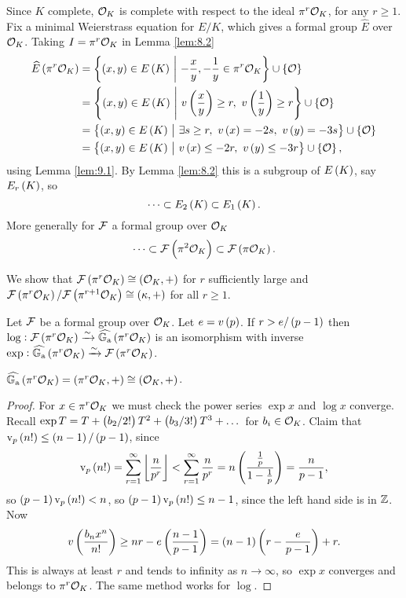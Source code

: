 Since $ K $ complete, $ \mathcal{O}_K $ is complete with respect to the ideal $ \pi^r\mathcal{O}_K $, for any $ r \ge 1 $. Fix a minimal Weierstrass equation for $ E / K $, which gives a formal group $ \widehat{E} $ over $ \mathcal{O}_K $. Taking $ I = \pi^r\mathcal{O}_K $ in Lemma \ref{lem:8.2}
\begin{align*}
\widehat{E}\br{\pi^r\OOO_K}
& = \cbr{\br{x, y} \in E\br{K} \st -\dfrac{x}{y}, -\dfrac{1}{y} \in \pi^r\OOO_K} \cup \cbr{\OOO} \\
& = \cbr{\br{x, y} \in E\br{K} \st v\br{\dfrac{x}{y}} \ge r, \ v\br{\dfrac{1}{y}} \ge r} \cup \cbr{\OOO} \\
& = \cbr{\br{x, y} \in E\br{K} \st \exists s \ge r, \ v\br{x} = -2s, \ v\br{y} = -3s} \cup \cbr{\OOO} \\
& = \cbr{\br{x, y} \in E\br{K} \st v\br{x} \le -2r, \ v\br{y} \le -3r} \cup \cbr{\OOO},
\end{align*}
using Lemma \ref{lem:9.1}. By Lemma \ref{lem:8.2} this is a subgroup of $ E\br{K} $, say $ E_r\br{K} $, so
$$ \dots \subset E_2\br{K} \subset E_1\br{K}. $$
More generally for $ \mathcal{F} $ a formal group over $ \mathcal{O}_K $
$$ \dots \subset \FFF\br{\pi^2\OOO_K} \subset \FFF\br{\pi\OOO_K}. $$

\pagebreak

We show that $ \FFF\br{\pi^r\OOO_K} \cong \br{\OOO_K, +} $ for $ r $ sufficiently large and $ \FFF\br{\pi^r\OOO_K} / \FFF\br{\pi^{r + 1}\OOO_K} \cong \br{\kappa, +} $ for all $ r \ge 1 $.


\begin{theorem}
\label{thm:9.2}
Let $ \mathcal{F} $ be a formal group over $ \mathcal{O}_K $. Let $ e = v\br{p} $. If $ r > e / \br{p - 1} $ then $ \log : \FFF\br{\pi^r\OOO_K} \xrightarrow{\sim} \widehat{\GG_\a}\br{\pi^r\OOO_K} $ is an isomorphism with inverse $ \exp : \widehat{\GG_\a}\br{\pi^r\OOO_K} \xrightarrow{\sim} \FFF\br{\pi^r\OOO_K} $.
\end{theorem}

\begin{remark*}
$ \widehat{\GG_\a}\br{\pi^r\OOO_K} = \br{\pi^r\OOO_K, +} \cong \br{\OOO_K, +} $.
\end{remark*}

\begin{proof}
For $ x \in \pi^r\mathcal{O}_K $ we must check the power series $ \exp x $ and $ \log x $ converge. Recall $ \exp T = T + \br{b_2 / 2!}T^2 + \br{b_3 / 3!}T^3 + \dots $ for $ b_i \in \mathcal{O}_K $. Claim that $ \v_p\br{n!} \le \br{n - 1} / \br{p - 1} $, since
$$ \v_p\br{n!} = \sum_{r = 1}^\infty \fbr{\dfrac{n}{p^r}} < \sum_{r = 1}^\infty \dfrac{n}{p^r} = n\br{\dfrac{\tfrac{1}{p}}{1 - \tfrac{1}{p}}} = \dfrac{n}{p - 1}, $$
so $ \br{p - 1}\v_p\br{n!} < n $, so $ \br{p - 1}\v_p\br{n!} \le n - 1 $, since the left hand side is in $ \mathbb{Z} $. Now
$$ v\br{\dfrac{b_nx^n}{n!}} \ge nr - e\br{\dfrac{n - 1}{p - 1}} = \br{n - 1}\br{r - \dfrac{e}{p - 1}} + r. $$
This is always at least $ r $ and tends to infinity as $ n \to \infty $, so $ \exp x $ converges and belongs to $ \pi^r\mathcal{O}_K $. The same method works for $ \log $.
\end{proof}

